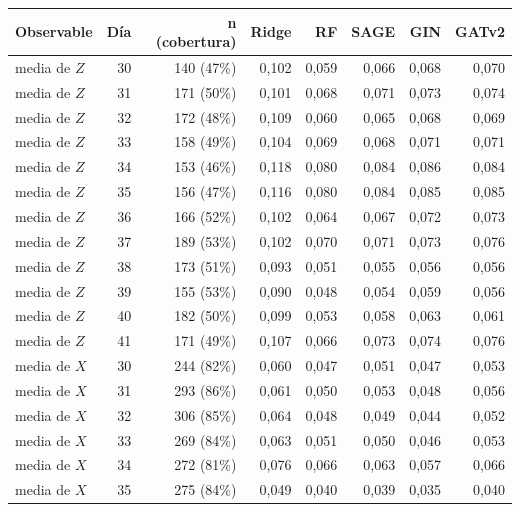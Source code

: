 \begin{table}[htbp]
    \centering
    {\footnotesize
    \begin{tabular}{@{}lrrrrrrr@{}}
        \toprule
        \textbf{Observable} & \textbf{Día} & \textbf{n (cobertura)} & \textbf{Ridge} & \textbf{RF} & \textbf{SAGE} & \textbf{GIN} & \textbf{GATv2} \\
        \midrule
        media de $Z$ & 30 & 140 (47\%) & 0,102 & 0,059 & 0,066 & 0,068 & 0,070 \\
        media de $Z$ & 31 & 171 (50\%) & 0,101 & 0,068 & 0,071 & 0,073 & 0,074 \\
        media de $Z$ & 32 & 172 (48\%) & 0,109 & 0,060 & 0,065 & 0,068 & 0,069 \\
        media de $Z$ & 33 & 158 (49\%) & 0,104 & 0,069 & 0,068 & 0,071 & 0,071 \\
        media de $Z$ & 34 & 153 (46\%) & 0,118 & 0,080 & 0,084 & 0,086 & 0,084 \\
        media de $Z$ & 35 & 156 (47\%) & 0,116 & 0,080 & 0,084 & 0,085 & 0,085 \\
        media de $Z$ & 36 & 166 (52\%) & 0,102 & 0,064 & 0,067 & 0,072 & 0,073 \\
        media de $Z$ & 37 & 189 (53\%) & 0,102 & 0,070 & 0,071 & 0,073 & 0,076 \\
        media de $Z$ & 38 & 173 (51\%) & 0,093 & 0,051 & 0,055 & 0,056 & 0,056 \\
        media de $Z$ & 39 & 155 (53\%) & 0,090 & 0,048 & 0,054 & 0,059 & 0,056 \\
        media de $Z$ & 40 & 182 (50\%) & 0,099 & 0,053 & 0,058 & 0,063 & 0,061 \\
        media de $Z$ & 41 & 171 (49\%) & 0,107 & 0,066 & 0,073 & 0,074 & 0,076 \\
        media de $X$ & 30 & 244 (82\%) & 0,060 & 0,047 & 0,051 & 0,047 & 0,053 \\
        media de $X$ & 31 & 293 (86\%) & 0,061 & 0,050 & 0,053 & 0,048 & 0,056 \\
        media de $X$ & 32 & 306 (85\%) & 0,064 & 0,048 & 0,049 & 0,044 & 0,052 \\
        media de $X$ & 33 & 269 (84\%) & 0,063 & 0,051 & 0,050 & 0,046 & 0,053 \\
        media de $X$ & 34 & 272 (81\%) & 0,076 & 0,066 & 0,063 & 0,057 & 0,066 \\
        media de $X$ & 35 & 275 (84\%) & 0,049 & 0,040 & 0,039 & 0,035 & 0,040 \\

\end{tabular}}
\end{table}
